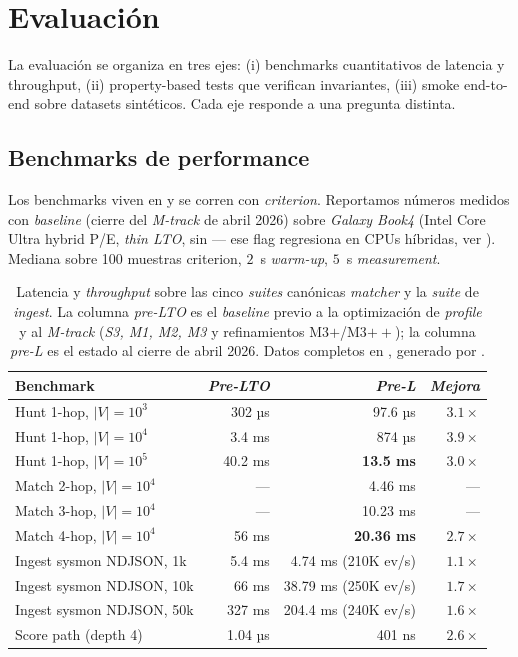 \chapter{Evaluación}
\label{sec:paper-eval}

La evaluación se organiza en tres ejes: (i) benchmarks
cuantitativos de latencia y throughput, (ii) property-based tests
que verifican invariantes, (iii) smoke end-to-end sobre datasets
sintéticos. Cada eje responde a una pregunta distinta.

\section{Benchmarks de performance}

Los benchmarks viven en
 y se corren con
\emph{criterion}. Reportamos números medidos con \emph{baseline
} (cierre del \emph{M-track} de abril 2026) sobre
\emph{Galaxy Book4} (Intel Core Ultra hybrid P/E, \emph{thin LTO},
sin  --- ese flag regresiona en CPUs
híbridas, ver ). Mediana
sobre 100 muestras criterion, $2$~s \emph{warm-up}, $5$~s
\emph{measurement}.

\begin{table}[H]
\centering
\small
\begin{tabular}{@{}lrrr@{}}
\toprule
Benchmark & \emph{Pre-LTO} & \emph{Pre-L} & \emph{Mejora} \\
\midrule
Hunt 1-hop, $|V|=10^3$   & 302 µs   & 97.6 µs  & $3.1\times$ \\
Hunt 1-hop, $|V|=10^4$   & 3.4 ms   & 874 µs   & $3.9\times$ \\
Hunt 1-hop, $|V|=10^5$   & 40.2 ms  & \textbf{13.5 ms} & $3.0\times$ \\
Match 2-hop, $|V|=10^4$  & ---      & 4.46 ms  & --- \\
Match 3-hop, $|V|=10^4$  & ---      & 10.23 ms & --- \\
Match 4-hop, $|V|=10^4$  & 56 ms    & \textbf{20.36 ms} & $2.7\times$ \\
Ingest sysmon NDJSON, 1k & 5.4 ms   & 4.74 ms (210K ev/s) & $1.1\times$ \\
Ingest sysmon NDJSON, 10k & 66 ms   & 38.79 ms (250K ev/s) & $1.7\times$ \\
Ingest sysmon NDJSON, 50k & 327 ms  & 204.4 ms (240K ev/s) & $1.6\times$ \\
Score path (depth 4) & 1.04 µs    & 401 ns   & $2.6\times$ \\
\bottomrule
\end{tabular}
\caption{Latencia y \emph{throughput} sobre las cinco \emph{suites}
canónicas \emph{matcher} y la \emph{suite} de \emph{ingest}. La
columna \emph{pre-LTO} es el \emph{baseline} previo a la
optimización de \emph{profile} y al \emph{M-track} (\emph{S3, M1,
M2, M3} y refinamientos M3$+$/M3$++$); la columna \emph{pre-L} es
el estado al cierre de abril 2026. Datos completos
en , generado por
.}
\label{tab:paper-bench}
\end{table}

